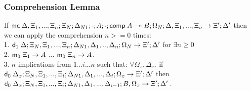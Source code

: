 \subsubsection{Comprehension Lemma}

If $\mathsf{mc} \; \Delta, \Xi_1, ..., \Xi_n; \Xi_N; \Delta_{N1}; \cdot; A; \cdot; \mathsf{comp} \; A \multimap B; \Omega_N; \Delta, \Xi_1, ..., \Xi_n \rightarrow \Xi'; \Delta'$ then we can apply the comprehension $n >= 0$ times: \\
1. \hspace{1cm} $\mathsf{d}_1 \; \Delta; \Xi_N, \Xi_1, ..., \Xi_n; \Delta_{N1}, \Delta_1, .., \Delta_n; \Omega_N \rightarrow \Xi'; \Delta'$ for $\exists n \geq 0$\\
2. \hspace{1cm} $\mathsf{m}_0 \; \Xi_1 \rightarrow A$ ... $\mathsf{m}_0 \; \Xi_n \rightarrow A$.\\
3. \hspace{1cm} $n$ implications from $1 ... i ... n$ such that: $\forall \Omega_x, \Delta_x.$ if $\mathsf{d}_0 \; \Delta_x; \Xi_N, \Xi_1, ..., \Xi_i; \Delta_{N1}, \Delta_1, ..., \Delta_i; \Omega_x \rightarrow \Xi'; \Delta'$ then $\mathsf{d}_0 \; \Delta_x; \Xi_N, \Xi_1, ..., \Xi_i; \Delta_{N1}, \Delta_1, ..., \Delta_{i-1}; B, \Omega_x \rightarrow \Xi'; \Delta'$.

